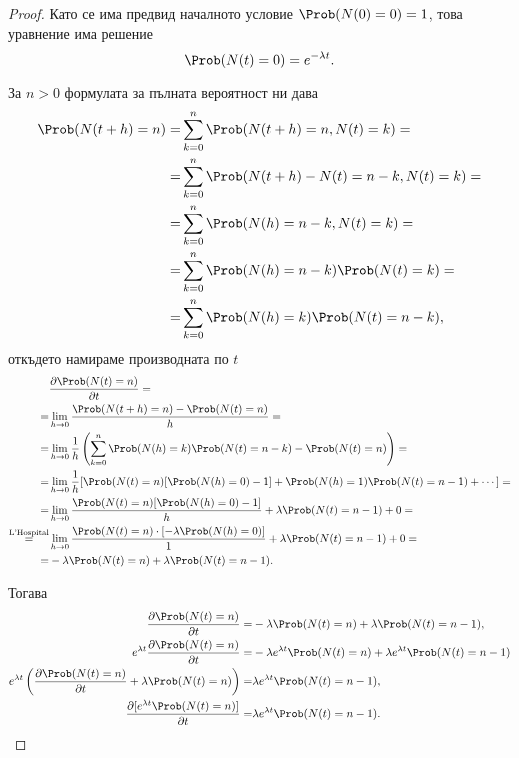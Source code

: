 \documentclass[numbers=endperiod, bibliography=totocnumbered]{scrartcl}
\begin{document}
\begin{proof}
  Като се има предвид началното условие \( \Prob(N(0) = 0) = 1 \), това уравнение има решение
  \begin{equation*}
   \Prob(N(t) = 0) = e^{-\lambda t}.
  \end{equation*}

  За \( n > 0 \) формулата за пълната вероятност ни дава
  \begin{align*}
    \Prob(N(t+h) = n)
    =&
    \sum_{k=0}^n \Prob(N(t+h) = n, N(t) = k)
    = \\ =&
    \sum_{k=0}^n \Prob(N(t+h) - N(t) = n - k, N(t) = k)
    = \\ =&
    \sum_{k=0}^n \Prob(N(h) = n - k, N(t) = k)
    = \\ =&
    \sum_{k=0}^n \Prob(N(h) = n - k) \Prob(N(t) = k)
    = \\ =&
    \sum_{k=0}^n \Prob(N(h) = k) \Prob(N(t) = n - k),
  \end{align*}
  откъдето намираме производната по \( t \)
  \begin{align*}
    &\frac {\partial \Prob(N(t) = n)} {\partial t}
    = \\ =&
    \lim_{h \to 0} \frac {\Prob(N(t+h) = n) - \Prob(N(t) = n)} h
    = \\ =&
    \lim_{h \to 0} \frac 1 h \left( \sum_{k=0}^n \Prob(N(h) = k) \Prob(N(t) = n - k) - \Prob(N(t) = n) \right)
    = \\ =&
    \lim_{h \to 0} \frac 1 h [\Prob(N(t) = n) [\Prob(N(h) = 0) - 1] + \Prob(N(h) = 1) \Prob(N(t) = n - 1) + \cdots]
    = \\ =&
    \lim_{h \to 0} \frac {\Prob(N(t) = n) [\Prob(N(h) = 0) - 1]} h + \lambda \Prob(N(t) = n - 1) + 0
    = \\ \overset {\text{L'Hospital}} =&
    \lim_{h \to 0} \frac {\Prob(N(t) = n) \cdot [-\lambda \Prob(N(h) = 0)]} 1 + \lambda \Prob(N(t) = n - 1) + 0
    = \\ =&
    -\lambda \Prob(N(t) = n) + \lambda \Prob(N(t) = n - 1).
  \end{align*}

  Тогава
  \begin{align*}
    \frac {\partial \Prob(N(t) = n)} {\partial t}
    =&
    -\lambda \Prob(N(t) = n) + \lambda \Prob(N(t) = n - 1),
    \\
    e^{\lambda t} \frac {\partial \Prob(N(t) = n)} {\partial t}
    =&
    -\lambda e^{\lambda t} \Prob(N(t) = n) + \lambda e^{\lambda t} \Prob(N(t) = n - 1)
    \\
    e^{\lambda t} \left(\frac {\partial \Prob(N(t) = n)} {\partial t} + \lambda \Prob(N(t) = n) \right)
    =&
    \lambda e^{\lambda t} \Prob(N(t) = n - 1),
    \\
    \frac {\partial [e^{\lambda t} \Prob(N(t) = n)]} {\partial t}
    =&
    \lambda e^{\lambda t} \Prob(N(t) = n - 1).
  \end{align*}


\end{proof}
\end{document}
